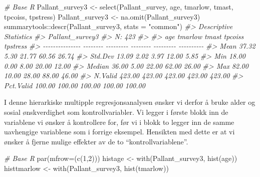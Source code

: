 \documentclass[
]{article}
\newenvironment{Shaded}{\begin{snugshade}}{\end{snugshade}}
\newcommand{\AttributeTok}[1]{\textcolor[rgb]{0.77,0.63,0.00}{#1}}
\newcommand{\CommentTok}[1]{\textcolor[rgb]{0.56,0.35,0.01}{\textit{#1}}}
\newcommand{\DecValTok}[1]{\textcolor[rgb]{0.00,0.00,0.81}{#1}}
\newcommand{\FunctionTok}[1]{\textcolor[rgb]{0.00,0.00,0.00}{#1}}
\newcommand{\NormalTok}[1]{#1}
\newcommand{\OtherTok}[1]{\textcolor[rgb]{0.56,0.35,0.01}{#1}}
\newcommand{\SpecialCharTok}[1]{\textcolor[rgb]{0.00,0.00,0.00}{#1}}
\newcommand{\StringTok}[1]{\textcolor[rgb]{0.31,0.60,0.02}{#1}}
\begin{document}
\begin{Shaded}
\begin{Highlighting}[]
\CommentTok{\# Base R}
\NormalTok{Pallant\_survey3 }\OtherTok{\textless{}{-}} \FunctionTok{select}\NormalTok{(Pallant\_survey, age, tmarlow, tmast, tpcoiss, tpstress)}
\NormalTok{Pallant\_survey3 }\OtherTok{\textless{}{-}} \FunctionTok{na.omit}\NormalTok{(Pallant\_survey3)}
\NormalTok{summarytools}\SpecialCharTok{::}\FunctionTok{descr}\NormalTok{(Pallant\_survey3, }\AttributeTok{stats =} \StringTok{"common"}\NormalTok{)}
\CommentTok{\#\textgreater{} Descriptive Statistics  }
\CommentTok{\#\textgreater{} Pallant\_survey3  }
\CommentTok{\#\textgreater{} N: 423  }
\CommentTok{\#\textgreater{} }
\CommentTok{\#\textgreater{}                      age   tmarlow    tmast   tpcoiss   tpstress}
\CommentTok{\#\textgreater{} {-}{-}{-}{-}{-}{-}{-}{-}{-}{-}{-}{-}{-}{-}{-} {-}{-}{-}{-}{-}{-}{-}{-} {-}{-}{-}{-}{-}{-}{-}{-}{-} {-}{-}{-}{-}{-}{-}{-}{-} {-}{-}{-}{-}{-}{-}{-}{-}{-} {-}{-}{-}{-}{-}{-}{-}{-}{-}{-}}
\CommentTok{\#\textgreater{}            Mean    37.32      5.30    21.77     60.56      26.74}
\CommentTok{\#\textgreater{}         Std.Dev    13.09      2.02     3.97     12.00       5.85}
\CommentTok{\#\textgreater{}             Min    18.00      0.00     8.00     20.00      12.00}
\CommentTok{\#\textgreater{}          Median    36.00      5.00    22.00     62.00      26.00}
\CommentTok{\#\textgreater{}             Max    82.00     10.00    28.00     88.00      46.00}
\CommentTok{\#\textgreater{}         N.Valid   423.00    423.00   423.00    423.00     423.00}
\CommentTok{\#\textgreater{}       Pct.Valid   100.00    100.00   100.00    100.00     100.00}
\end{Highlighting}
\end{Shaded}

I denne hierarkiske multipple regresjonsanalysen ønsker vi derfor å bruke alder og sosial ønskverdighet som kontrollvariabler. Vi legger i første blokk inn de variablene vi ønsker å kontrollere for, før vi i blokk to legger inn de samme uavhengige variablene som i forrige eksempel. Hensikten med dette er at vi ønsker å fjerne mulige effekter av de to ``kontrollvariablene''.

\begin{Shaded}
\begin{Highlighting}[]
\CommentTok{\# Base R}
\FunctionTok{par}\NormalTok{(}\AttributeTok{mfrow=}\NormalTok{(}\FunctionTok{c}\NormalTok{(}\DecValTok{1}\NormalTok{,}\DecValTok{2}\NormalTok{)))}
\NormalTok{histage }\OtherTok{\textless{}{-}} \FunctionTok{with}\NormalTok{(Pallant\_survey3, }\FunctionTok{hist}\NormalTok{(age))}
\NormalTok{histtmarlow }\OtherTok{\textless{}{-}} \FunctionTok{with}\NormalTok{(Pallant\_survey3, }\FunctionTok{hist}\NormalTok{(tmarlow))}
\end{Highlighting}
\end{Shaded}
\end{document}
